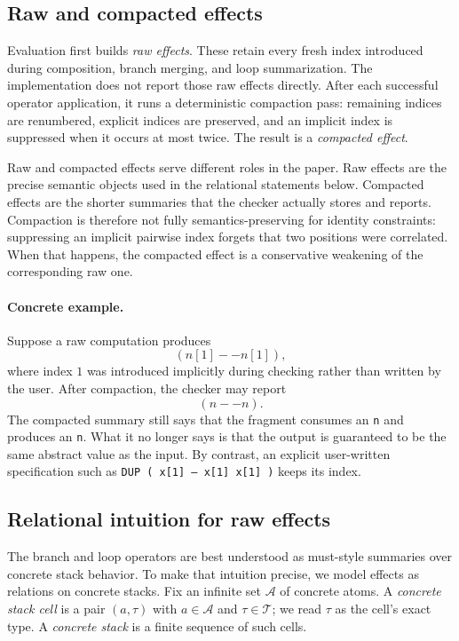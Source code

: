 \documentclass[acmsmall,screen,review,anonymous,nonacm]{acmart}
\newcommand{\Types}{\mathcal{T}}
\begin{document}
\subsection{Raw and compacted effects}
Evaluation first builds \emph{raw effects}. These retain every fresh index introduced
during composition, branch merging, and loop summarization. The implementation does not
report those raw effects directly. After each successful operator application, it runs a
deterministic compaction pass: remaining indices are renumbered, explicit indices are
preserved, and an implicit index is suppressed when it occurs at most twice. The result
is a \emph{compacted effect}.

Raw and compacted effects serve different roles in the paper. Raw effects are the precise
semantic objects used in the relational statements below. Compacted effects are the
shorter summaries that the checker actually stores and reports. Compaction is therefore
not fully semantics-preserving for identity constraints: suppressing an implicit pairwise
index forgets that two positions were correlated. When that happens, the compacted effect
is a conservative weakening of the corresponding raw one.

\paragraph{Concrete example.}
Suppose a raw computation produces
\[
(n[1] -- n[1]),
\]
where index $1$ was introduced implicitly during checking rather than written by the
user. After compaction, the checker may report
\[
(n -- n).
\]
The compacted summary still says that the fragment consumes an \texttt{n} and produces an
\texttt{n}. What it no longer says is that the output is guaranteed to be the same
abstract value as the input. By contrast, an explicit user-written specification such as
\texttt{DUP ( x[1] -- x[1] x[1] )} keeps its index.

\subsection{Relational intuition for raw effects}
The branch and loop operators are best understood as must-style summaries over concrete
stack behavior. To make that intuition precise, we model effects as relations on
concrete stacks. Fix an infinite set $\mathcal{A}$ of concrete atoms. A
\emph{concrete stack cell} is a pair $(a,\tau)$ with
$a \in \mathcal{A}$ and $\tau \in \Types$; we read $\tau$ as the cell's exact type. A
\emph{concrete stack} is a finite sequence of such cells.
\end{document}
